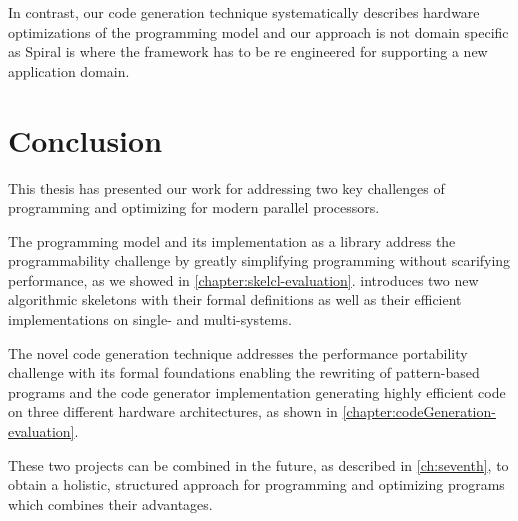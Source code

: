 In contrast, our code generation technique systematically describes hardware optimizations of the \OpenCL programming model and our approach is not domain specific as Spiral is where the framework has to be re engineered for supporting a new application domain.




\section{Conclusion}
This thesis has presented our work for addressing two key challenges of programming and optimizing for modern parallel processors.

The \SkelCL programming model and its implementation as a \Cpp library address the programmability challenge by greatly simplifying programming without scarifying performance, as we showed in \autoref{chapter:skelcl-evaluation}.
\SkelCL introduces two new algorithmic skeletons with their formal definitions as well as their efficient implementations on single- and multi-\GPU systems.

The novel code generation technique addresses the performance portability challenge with its formal foundations enabling the rewriting of pattern-based programs and the code generator implementation generating highly efficient \OpenCL code on three different hardware architectures, as shown in \autoref{chapter:codeGeneration-evaluation}.

These two projects can be combined in the future, as described in \autoref{ch:seventh}, to obtain a holistic, structured approach for programming and optimizing programs which combines their advantages.


